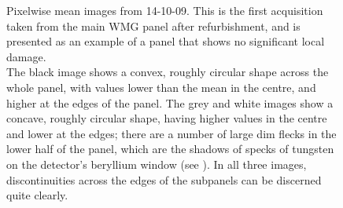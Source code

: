 \documentclass[\main/IO-Pixels.tex]{subfiles}
\begin{document}


\begin{figure}
\caption{ Pixelwise mean images from 14-10-09. This is the first acquisition taken from the main WMG panel after refurbishment, and is presented as an example of a panel that shows no significant local damage.\\
\footnotesize{The black image shows a convex, roughly circular shape across the whole panel, with values lower than the mean in the centre, and higher at the edges of the panel. The grey and white images show a concave, roughly circular shape, having higher values in the centre and lower at the edges; there are a number of large dim flecks in the lower half of the panel, which are the shadows of specks of tungsten on the detector's beryllium window (see ). In all three images, discontinuities across the edges of the subpanels can be discerned quite clearly.}}
\label{fig:pwm-images}
    
\end{figure}
\end{document}
